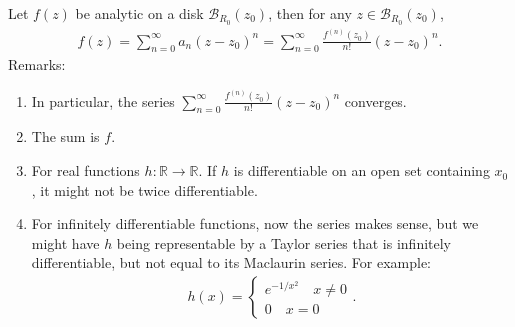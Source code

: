 \documentclass{article}
\theoremstyle{definition}
\newcommand{\R}{\mathbb{R}}
\newcommand{\f}[2]{\frac{#1}{#2}}
\newcommand{\B}{\mathcal{B}}
\begin{document}
Let $f(z)$ be analytic on a disk $\B_{R_0}(z_0)$, then for any $z \in \B_{R_0}(z_0)$, 
\begin{align}
f(z) = \sum^\infty_{n=0}a_n(z - z_0)^n = \sum^\infty_{n=0} \f{f^{(n)}(z_0)}{n!}(z - z_0)^n.
\end{align} 
Remarks:
\begin{enumerate}
	\item  In particular, the series $\sum^\infty_{n=0} \f{f^{(n)}(z_0)}{n!}(z - z_0)^n$ converges. 
	
	\item The sum is $f$. 
	
	\item For real functions $h: \R \to \R$. If $h$ is differentiable on an open set containing $x_0$, it might not be twice differentiable. 
	
	\item For infinitely differentiable functions, now the series makes sense, but we might have $h$ being representable by a Taylor series that is infinitely differentiable, but not equal to its Maclaurin series. For example:
	\begin{align}
	h(x) = \begin{cases}
	e^{-1/x^2}\quad x\neq 0\\
	0 \quad x = 0
	\end{cases}.
	\end{align}
\end{enumerate}
\end{document}
